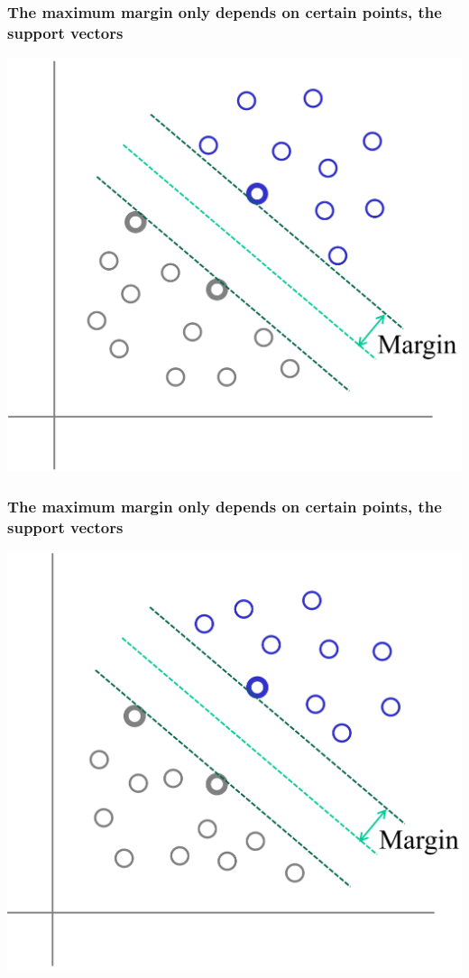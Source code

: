 \documentclass[12pt,notes,mathserif]{beamer}
\begin{document}
\begin{frame}[c]
\frametitle{The maximum margin only depends on certain points, the support vectors}
\begin{center}
\includegraphics[width=0.7\linewidth]{fig8/lec88.jpg}
\end{center}
\end{frame}

\begin{frame}[c]
\frametitle{The maximum margin only depends on certain points, the support vectors}
\begin{center}
\includegraphics[width=0.7\linewidth]{fig8/lec89.jpg}
\end{center}
\end{frame}
\end{document}

